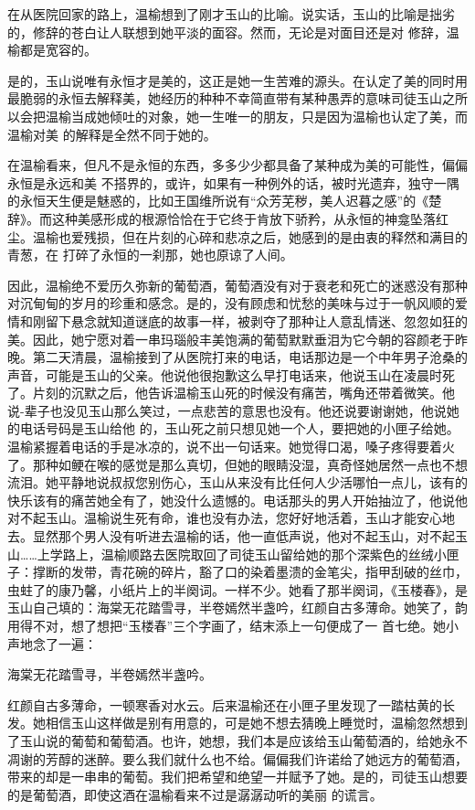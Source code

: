 \documentclass{article}
\begin{document}
在从医院回家的路上，温榆想到了刚才玉山的比喻。说实话，玉山的比喻是拙劣的，修辞的苍白让人联想到她平淡的面容。然而，无论是对面目还是对
修辞，温榆都是宽容的。 

是的，玉山说唯有永恒才是美的，这正是她一生苦难的源头。在认定了美的同时用最脆弱的永恒去解释美，她经历的种种不幸简直带有某种愚弄的意味司徒玉山之所以会把温榆当成她倾吐的对象，她一生唯一的朋友，只是因为温榆也认定了美，而温榆对美
的解释是全然不同于她的。 

在温榆看来，但凡不是永恒的东西，多多少少都具备了某种成为美的可能性，偏偏永恒是永远和美
\newpage
不搭界的，或许，如果有一种例外的话，被时光遗弃，独守一隅的永恒天生便是魅惑的，比如王国维所说有“众芳芜秽，美人迟暮之感”的《楚辞》。而这种美感形成的根源恰恰在于它终于肯放下骄矜，从永恒的神龛坠落红尘。温榆也爱残损，但在片刻的心碎和悲凉之后，她感到的是由衷的释然和满目的青葱，在
打碎了永恒的一刹那，她也原谅了人间。 

因此，温榆绝不爱历久弥新的葡萄酒，葡萄酒没有对于衰老和死亡的迷惑没有那种对沉甸甸的岁月的珍重和感念。是的，没有顾虑和忧愁的美味与过于一帆风顺的爱情和刚留下悬念就知道谜底的故事一样，被剥夺了那种让人意乱情迷、忽忽如狂的美。因此，她宁愿对着一串玛瑙般丰美饱满的葡萄默默垂泪为它今朝的容颜老于昨晚。第二天清晨，温榆接到了从医院打来的电话，电话那边是一个中年男子沧桑的声音，可能是玉山的父亲。他说他很抱歉这么早打电话来，他说玉山在凌晨时死了。片刻的沉默之后，他告诉温榆玉山死的时候没有痛苦，嘴角还带着微笑。他说-辈子也没见玉山那么笑过，一点悲苦的意思也没有。他还说要谢谢她，他说她的电话号码是玉山给他
\newpage
的，玉山死之前只想见她一个人，要把她的小匣子给她。温榆紧握着电话的手是冰凉的，说不出一句话来。她觉得口渴，嗓子疼得要着火了。那种如鲠在喉的感觉是那么真切，但她的眼睛没湿，真奇怪她居然一点也不想流泪。她平静地说叔叔您别伤心，玉山从来没有比任何人少活哪怕一点儿，该有的快乐该有的痛苦她全有了，她没什么遗憾的。电话那头的男人开始抽泣了，他说他对不起玉山。温榆说生死有命，谁也没有办法，您好好地活着，玉山才能安心地去。显然那个男人没有听进去温榆的话，他一直低声说，他对不起玉山，对不起玉山……上学路上，温榆顺路去医院取回了司徒玉山留给她的那个深紫色的丝绒小匣子：撑断的发带，青花碗的碎片，豁了口的染着墨溃的金笔尖，指甲刮破的丝巾，虫蛀了的康乃馨，小纸片上的半阕词。一样不少。她看了那半阕词，《玉楼春》，是玉山自己填的：海棠无花踏雪寻，半卷嫣然半盏吟，红颜自古多薄命。她笑了，韵用得不对，想了想把“玉楼春”三个字画了，结末添上一句便成了一
首七绝。她小声地念了一遍： 


\newpage

海棠无花踏雪寻，半卷嫣然半盏吟。 

红颜自古多薄命，一顿寒香对水云。后来温榆还在小匣子里发现了一踏枯黄的长发。她相信玉山这样做是别有用意的，可是她不想去猜晚上睡觉时，温榆忽然想到了玉山说的葡萄和葡萄酒。也许，她想，我们本是应该给玉山葡萄酒的，给她永不凋谢的芳醇的迷醉。要么我们就什么也不给。偏偏我们许诺给了她远方的葡萄酒，带来的却是一串串的葡萄。我们把希望和绝望一并赋予了她。是的，司徒玉山想要的是葡萄酒，即使这酒在温榆看来不过是潺潺动听的美丽
的谎言。 
\end{document}
